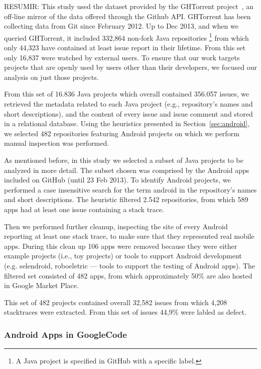 \documentclass[conference]{IEEEtran}
\begin{document}
RESUMIR:
This study used the dataset provided by the GHTorrent project~\cite{Gousi13}, an off-line mirror of the data 
offered through the Github API.  GHTorrent has been collecting data from Git since 
February 2012. Up to Dec 2013, and when we queried GHTorrent, it included 332,864 non-fork Java
repositories \footnote {A Java project is specified in GitHub with a
specific label.}  from which only 44,323 have contained at least issue report in their lifetime. From this set only 16,837 were watched by external users. To ensure that our work targets projects that are openly used by
users other than their developers, we focused our analysis on just those projects. 

From this set of 16.836 Java projects which overall contained 356.057 issues, we retrieved the metadata related to each Java project (e.g., repository's names and short descriptions), and the content of every issue and issue comment and stored in a relational database. Using the heuristics presented in Section~\ref{sec:android}, we selected 482 repositories featuring Android projects on which we perform manual inspection was performed.

As mentioned before, in this study we selected a subset of Java projects to
be analyzed in more detail. The subset chosen was comprised by the Android apps
included on GitHub (until 23 Feb 2013).
To identify Android projects, we performed a case insensitive search for the
term \textsf{android} in the repository's names and short descriptions.  The
heuristic filtered 2.542 repositories, from which 589 apps had at least one
issue containing a stack trace.

Then we performed further cleanup, inspecting the site of every Android
reporting at least one stack trace, to make sure that they represented real
mobile apps. During this clean up 106 apps were removed because they were either
example projects (i.e., toy projects) or tools to support Android development
(e.g. \textsf{selendroid}, \textsf{roboeletric} --- tools to support the testing of Android apps).
The filtered set consisted of 482 apps, from which approximately 50\% are also
hosted in Google Market Place. 

This set of 482 projects contained overall 32,582 issues from which 4,208 stacktraces 
were extracted. From this set of issues 44,9\% were labled as defect.


\subsubsection{Android Apps in GoogleCode}
\end{document}
